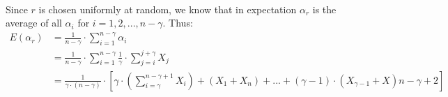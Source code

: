 \documentclass{article}
\begin{document}
\paragraph{}Since $r$ is chosen uniformly at random, we know that in expectation $\alpha_{r}$ is the average of all $\alpha_{i}$ for $i = 1, 2, ..., n - \gamma$. Thus:
\begin{align*}
E(\alpha_{r}) &= \frac{1}{n - \gamma} \cdot \sum_{i = 1}^{n - \gamma}\alpha_{i} \\
&= \frac{1}{n - \gamma} \cdot \sum_{i = 1}^{n - \gamma} \frac{1}{\gamma} \cdot \sum_{j = i}^{j + \gamma}X_{j} \\
&= \frac{1}{\gamma \cdot (n - \gamma)} \cdot \left[ \gamma \cdot \left( \sum_{i=\gamma}^{n - \gamma + 1} X_{i} \right) + (X_{1} + X_{n}) + ... + (\gamma - 1) \cdot (X_{\gamma - 1} + X){n - \gamma + 2} \right]
\end{align*}
\end{document}
